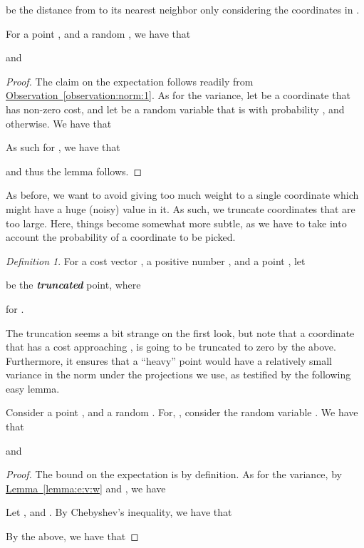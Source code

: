 \documentclass[12pt]{article}\usepackage[cm]{fullpage}
\newcommand{\emphic}[2]{\textcolor{blue25}{\textbf{\emph{#1}}}\index{#2}}
\renewcommand{\emphic}[2]{\textbf{\emph{#1}}}
\newcommand{\emphi}[1]{\emphic{#1}{#1}}
\theoremstyle{remark}\theoremheaderfont{\sf}\theorembodyfont{\upshape}\newtheorem{defn}[theorem]{Definition}
\numberwithin{figure}{section}\numberwithin{table}{section}\numberwithin{equation}{section}
\newcommand{\HLink}[2]{\hyperref[#2]{#1~\ref*{#2}}}
\newcommand{\lemlab}[1]{\label{lemma:#1}}
\newcommand{\lemref}[1]{\HLink{Lemma}{lemma:#1}}
\newcommand{\obsref}[1]{\HLink{Observation}{observation:#1}}
\begin{document}
be the distance from  to its nearest neighbor only considering
the coordinates in .


\begin{lemma}
    \lemlab{e:v:w}For a point , and a random
    , we have that
    
    and
    
\end{lemma}
\begin{proof}
    The claim on the expectation follows readily from
    \obsref{norm:1}. As for the variance, let  be a coordinate that
    has non-zero cost, and let  be a random variable that is
     with probability , and 
    otherwise. We have that
    
    As such for , we have that
    
    and thus the lemma follows.
\end{proof}


As before, we want to avoid giving too much weight to a single
coordinate which might have a huge (noisy) value in it. As such, we
truncate coordinates that are too large. Here, things become somewhat
more subtle, as we have to take into account the probability of a
coordinate to be picked.


\begin{defn}
    For a cost vector , a positive number ,
    and a point , let
    
    be the \emphi{truncated} point, where
    
    for .
\end{defn}


The truncation seems a bit strange on the first look, but note that a
coordinate  that has a cost  approaching , is going to be
truncated to zero by the above. Furthermore, it ensures that a
``heavy'' point would have a relatively small variance in the norm
under the projections we use, as testified by the following easy
lemma.

\begin{lemma}
    \lemlab{stupid}Consider a point , and a random
    . For,
    ,
    consider the random variable .  We
    have that
    
    
    and
    
\end{lemma}
\begin{proof}
    The bound on the expectation is by definition. As for the
    variance, by \lemref{e:v:w} and , we have
    
    
    Let , and . By Chebyshev's
    inequality, we have that
    
    By the above, we have that
    
\end{proof}
\end{document}
